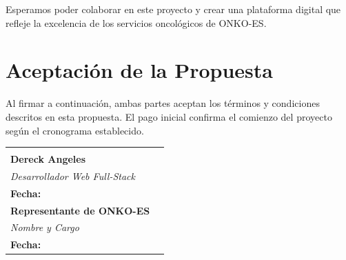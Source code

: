 \documentclass[12pt,a4paper]{article}
\begin{document}
Esperamos poder colaborar en este proyecto y crear una plataforma digital que refleje la excelencia de los servicios oncológicos de ONKO-ES.

\section{Aceptación de la Propuesta}

Al firmar a continuación, ambas partes aceptan los términos y condiciones descritos en esta propuesta. El pago inicial confirma el comienzo del proyecto según el cronograma establecido.

\vspace{3cm}

\begin{tabularx}{\textwidth}{X X}
    \begin{center}
        \hrulefill \\
        \vspace{0.2cm}
        \textbf{Dereck Angeles} \\
        \textit{Desarrollador Web Full-Stack} \\[1.5cm]
        \textbf{Fecha:} \underline{\hspace{4cm}}
    \end{center} &
    \begin{center}
        \hrulefill \\
        \vspace{0.2cm}
        \textbf{Representante de ONKO-ES} \\
        \textit{Nombre y Cargo} \\[1.5cm]
        \textbf{Fecha:} \underline{\hspace{4cm}}
    \end{center} \\
\end{tabularx}

\vspace{2cm}

\begin{center}
\end{center}
\end{document}
